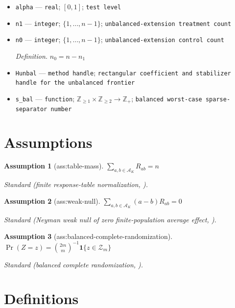 \documentclass{article}
\newtheorem{assumption}{Assumption}
\begin{document}
\begin{itemize}
  \item \texttt{alpha} --- \texttt{real}; \([0,1]\); \texttt{test level}
  \item \texttt{n1} --- \texttt{integer}; \(\{1,\ldots,n-1\}\); \texttt{unbalanced-\allowbreak{}extension treatment count}
  \item \texttt{n0} --- \texttt{integer}; \(\{1,\ldots,n-1\}\); \texttt{unbalanced-\allowbreak{}extension control count}
  \par\smallskip\noindent\emph{Definition.} \(n_0=n-n_1\)
  \item \texttt{Hunbal} --- \texttt{method handle}; \texttt{rectangular coefficient and stabilizer handle for the unbalanced frontier}
  \item \texttt{s\_\allowbreak{}bal} --- \texttt{function}; \(\mathbb Z_{\geq1}\times\mathbb Z_{\geq2}\to\mathbb Z_+\); \texttt{balanced worst-\allowbreak{}case sparse-\allowbreak{}separator number}
\end{itemize}

\section{Assumptions}

\begin{assumption}[ass:table-mass]\label{ass:table-mass}
\(\sum_{a,b\in\mathcal A_K}R_{ab}=n\)
\par\smallskip\noindent\emph{Standard} (finite response-table normalization, \cite{RigdonHudgens2015}).
\end{assumption}

\begin{assumption}[ass:weak-null]\label{ass:weak-null}
\(\sum_{a,b\in\mathcal A_K}(a-b)R_{ab}=0\)
\par\smallskip\noindent\emph{Standard} (Neyman weak null of zero finite-population average effect, \cite{WuDing2021}).
\end{assumption}

\begin{assumption}[ass:balanced-complete-randomization]\label{ass:balanced-complete-randomization}
\(\Pr(Z=z)=\binom{2m}{m}^{-1}\mathbf 1\{z\in\mathcal Z_m\}\)
\par\smallskip\noindent\emph{Standard} (balanced complete randomization, \cite{Fisher1935}).
\end{assumption}

\section{Definitions}
\end{document}
